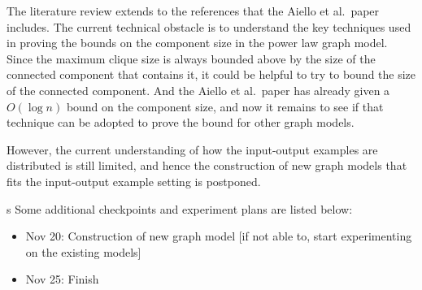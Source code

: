\documentclass{article}
\begin{document}
The literature review extends to the references that the Aiello et al.\ paper includes. The current technical obstacle is to understand the key techniques used in proving the bounds on the component size in the power law graph model. Since the maximum clique size is always bounded above by the size of the connected component that contains it, it could be helpful to try to bound the size of the connected component. And the Aiello et al.\ paper has already given a $O(\log n)$ bound on the component size, and now it remains to see if that technique can be adopted to prove the bound for other graph models. 

However, the current understanding of how the input-output examples are distributed is still limited, and hence the construction of new graph models that fits the input-output example setting is postponed.

s
Some additional checkpoints and experiment plans are listed below:

\begin{itemize}
	\item Nov 20: Construction of new graph model [if not able to, start experimenting on the existing models]
	\item Nov 25: Finish 
\end{itemize}
\end{document}
